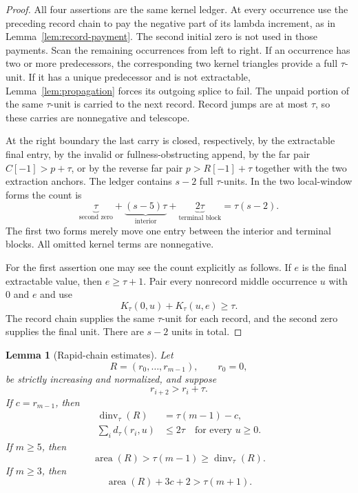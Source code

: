 \documentclass[11pt]{article}
\newtheorem{lemma}[theorem]{Lemma}
\theoremstyle{definition}
\theoremstyle{remark}
\newcommand{\area}{\operatorname{area}}
\newcommand{\dinv}{\operatorname{dinv}}
\begin{document}
\begin{proof}
All four assertions are the same kernel ledger.  At every occurrence use the
preceding record chain to pay the negative part of its lambda increment, as
in Lemma~\ref{lem:record-payment}.  The second initial zero is not used in
those payments.  Scan the remaining occurrences from left to right.  If an
occurrence has two or more predecessors, the corresponding two kernel
triangles provide a full $\tau$-unit.  If it has a unique predecessor and is
not extractable, Lemma~\ref{lem:propagation} forces its outgoing splice to
fail.  The unpaid portion of the same $\tau$-unit is carried to the next
record.  Record jumps are at most $\tau$, so these carries are nonnegative
and telescope.

At the right boundary the last carry is closed, respectively, by the
extractable final entry, by the invalid or fullness-obstructing append, by
the far pair $C[-1]>p+\tau$, or by the reverse far pair
$p>R[-1]+\tau$ together with the two extraction anchors.  The ledger contains
$s-2$ full $\tau$-units.  In the two local-window forms the count is
\[
  \underbrace{\tau}_{\text{second zero}}
  +\underbrace{(s-5)\tau}_{\text{interior}}
  +\underbrace{2\tau}_{\text{terminal block}}
  =\tau(s-2).
\]
The first two forms merely move one entry between the interior and terminal
blocks.  All omitted kernel terms are nonnegative.

For the first assertion one may see the count explicitly as follows.  If
$e$ is the final extractable value, then $e\ge\tau+1$.  Pair every nonrecord
middle occurrence $u$ with $0$ and $e$ and use
\[
  K_\tau(0,u)+K_\tau(u,e)\ge\tau.
\]
The record chain supplies the same $\tau$-unit for each record, and the
second zero supplies the final unit.  There are $s-2$ units in total.
\end{proof}

\begin{lemma}[Rapid-chain estimates]
\label{lem:rapid}
Let
\[
  R=(r_0,\ldots,r_{m-1}),
  \qquad r_0=0,
\]
be strictly increasing and normalized, and suppose
\[
  r_{i+2}>r_i+\tau.
\]
If $c=r_{m-1}$, then
\begin{align}
 \dinv_\tau(R)&=\tau(m-1)-c,\label{eq:rapid-dinv}\\
 \sum_i d_\tau(r_i,u)&\le2\tau
 \quad\text{for every }u\ge0.\label{eq:rapid-target}
\end{align}
If $m\ge5$, then
\begin{equation}
  \area(R)>\tau(m-1)\ge\dinv_\tau(R).
  \label{eq:rapid-area}
\end{equation}
If $m\ge3$, then
\begin{equation}
  \area(R)+3c+2>\tau(m+1).
  \label{eq:short-rapid}
\end{equation}
\end{lemma}
\end{document}
